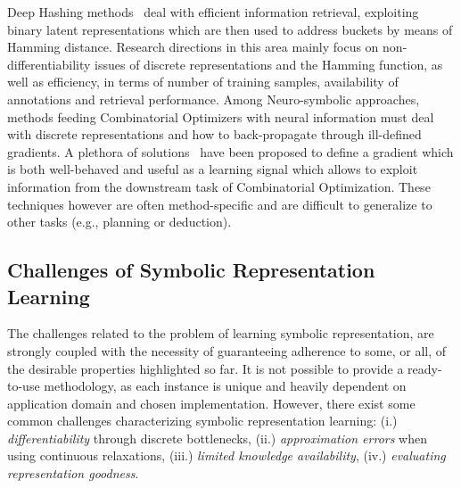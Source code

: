 %
Deep Hashing methods~\cite{luo2020survey} deal with efficient information retrieval, exploiting binary latent representations which are then used to address buckets by means of Hamming distance. Research directions in this area mainly focus on non-differentiability issues of discrete representations and the Hamming function, as well as efficiency, in terms of number of training samples, availability of annotations and retrieval performance.
%
Among Neuro-symbolic approaches, methods feeding Combinatorial Optimizers with neural information must deal with discrete representations and how to back-propagate through ill-defined gradients.
A plethora of solutions~\cite{agrawal2019differentiable,poganvcic2020differentiation,fredrikson2023learning,wang2019satnet} have been proposed to define a gradient which is both well-behaved and useful as a learning signal which allows to exploit information from the downstream task of Combinatorial Optimization. These techniques however are often method-specific and are difficult to generalize to other tasks (e.g., planning or deduction).

\subsection{Challenges of Symbolic Representation Learning}
\label{nesy2023:sec:cl}
The challenges related to the problem of learning symbolic representation, are strongly coupled with the necessity of guaranteeing adherence to some, or all, of the desirable properties highlighted so far.
It is not possible to provide a ready-to-use methodology, as each instance is unique and heavily dependent on application domain and chosen implementation. However, there exist some common challenges characterizing symbolic representation learning: (i.) \textit{differentiability} through discrete bottlenecks, (ii.) \textit{approximation errors} when using continuous relaxations, (iii.) \textit{limited knowledge availability}, (iv.) \textit{evaluating representation goodness}.

